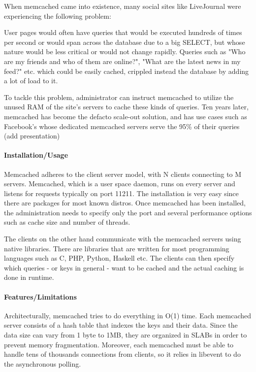 When memcached came into existence, many social sites like LiveJournal were 
experiencing the following problem:

User pages would often have queries that would be executed hundreds of times 
per second or would span across the database due to a big SELECT, but whose 
nature would be less critical or would not change rapidly. Queries such as "Who 
are my friends and who of them are online?", "What are the latest news in my 
feed?" etc. which could be easily cached, crippled instead the database by 
adding a lot of load to it.

To tackle this problem, administrator can instruct memcached to utilize the 
unused RAM of the site's servers to cache these kinds of queries. Ten years 
later, memcached has become the defacto scale-out solution, and has use cases 
such as Facebook's whose dedicated memcached servers serve the 95\% of their 
queries (\fixme add presentation)

\paragraph{Installation/Usage}

Memcached adheres to the client server model, with N clients connecting to M 
servers. Memcached, which is a user space daemon, runs on every server and
listens for requests typically on port 11211. The installation is very easy 
since there are packages for most known distros. Once memcached has been 
installed, the administration needs to specify only the port and several 
performance options such as cache size and number of threads.

The clients on the other hand communicate with the memcached servers using 
native libraries. There are libraries that are written for most programming 
languages such as C, PHP, Python, Haskell etc. The clients can then specify 
which queries - or keys in general - want to be cached and the actual caching 
is done in runtime.

\paragraph{Features/Limitations}

Architecturally, memcached tries to do everything in O(1) time. Each memcached 
server consists of a hash table that indexes the keys and their data. Since the 
data size can vary from 1 byte to 1MB, they are organized in SLABs in order to 
prevent memory fragmentation.  Moreover, each memcached must be able to handle 
tens of thousands connections from clients, so it relies in libevent to do the 
asynchronous polling.

